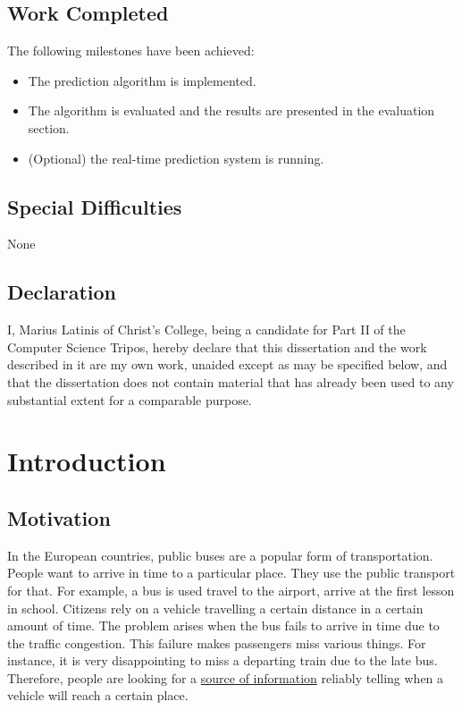 \documentclass[12pt,a4paper,oneside,openright]{report}
\begin{document}
\section*{Work Completed}

The following milestones have been achieved:

\begin{itemize}
\item The prediction algorithm is implemented.
\item The algorithm is evaluated and the results are presented in the evaluation section.
\item (Optional) the real-time prediction system is running.
\end{itemize}

\section*{Special Difficulties}

None
 
\section*{Declaration}

I, Marius Latinis of Christ's College, being a candidate for Part II of the Computer
Science Tripos, hereby declare that this dissertation and the work described 
in it are my own work, unaided except as may be specified below,
and that the dissertation does not contain material that has already been used to any substantial extent for a comparable purpose.

\bigskip
{}

\medskip
{}

\tableofcontents


\pagestyle{plain}


\chapter{Introduction}

\section{Motivation}

In the European countries, public buses are a popular form of transportation. People
want to arrive in time to a particular place. They use the public transport for that.
For example, a bus is used travel to the airport, arrive at the first lesson in
school. Citizens rely on a vehicle travelling a certain distance in a certain
amount of time. The problem arises when the bus fails to arrive in time due to the
traffic congestion. This failure makes passengers miss various things. For instance, it
is very disappointing to miss a departing train due to the late bus. Therefore,
people are looking for a \underline{source of information} reliably telling when a
vehicle will reach a certain place. \\
\end{document}
